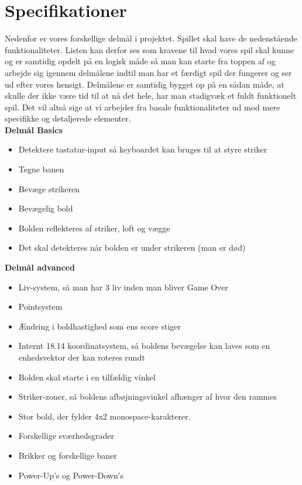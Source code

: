 \chapter{Specifikationer}

Nedenfor er vores forskellige delmål i projektet. Spillet skal have de nedenstående funktionaliteter. Listen kan derfor ses som kravene til hvad vores spil skal kunne og er samtidig opdelt på en logisk måde så man kan starte fra toppen af og arbejde sig igennem delmålene indtil man har et færdigt spil der fungerer og ser ud efter vores hensigt. Delmålene er samtidig bygget op på en sådan måde, at skulle der ikke være tid til at nå det hele, har man stadigvæk et fuldt funktionelt spil. Det vil altså sige at vi arbejder fra basale funktionaliteter ud mod mere specifikke og detaljerede elementer.\\

\textbf{Delmål Basics}
\begin{itemize}
\item Detektere tastatur-input så keyboardet kan bruges til at styre striker
\item Tegne banen
\item Bevæge strikeren
\item Bevægelig bold
\item Bolden reflekteres af striker, loft og vægge
\item Det skal detekteres når bolden er under strikeren (man er død)
\end{itemize}

\textbf{Delmål advanced}
\begin{itemize}
\item Liv-system, så man har 3 liv inden man bliver Game Over
\item Pointsystem
\item Ændring i boldhastighed som ens score stiger
\item Internt 18.14 koordinatsystem, så boldens bevægelse kan laves som en enhedsvektor der kan roteres rundt
\item Bolden skal starte i en tilfældig vinkel
\item Striker-zoner, så boldens afbøjningsvinkel afhænger af hvor den rammes 
\item Stor bold, der fylder 4x2 monospace-karakterer.
\item {Forskellige sværhedsgrader}
\item {Brikker og forskellige baner}
\item Power-Up's og Power-Down's
\end{itemize}	

